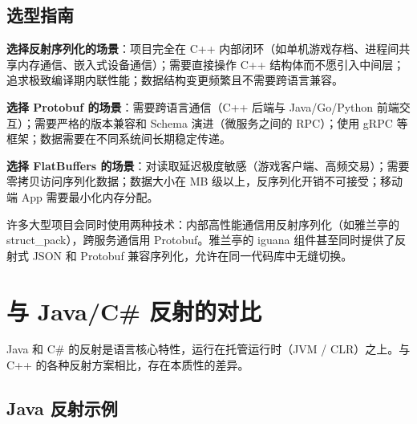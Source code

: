 \documentclass[12pt,a4paper,fontset=fandol]{ctexbook}
\begin{document}
\subsection{选型指南}

\textbf{选择反射序列化的场景}：项目完全在 C++ 内部闭环（如单机游戏存档、进程间共享内存通信、嵌入式设备通信）；需要直接操作 C++ 结构体而不愿引入中间层；追求极致编译期内联性能；数据结构变更频繁且不需要跨语言兼容。

\textbf{选择 Protobuf 的场景}：需要跨语言通信（C++ 后端与 Java/Go/Python 前端交互）；需要严格的版本兼容和 Schema 演进（微服务之间的 RPC）；使用 gRPC 等框架；数据需要在不同系统间长期稳定传递。

\textbf{选择 FlatBuffers 的场景}：对读取延迟极度敏感（游戏客户端、高频交易）；需要零拷贝访问序列化数据；数据大小在 MB 级以上，反序列化开销不可接受；移动端 App 需要最小化内存分配。

\begin{warning}[title={混合使用的常见模式}]
许多大型项目会同时使用两种技术：内部高性能通信用反射序列化（如雅兰亭的 struct\_pack），跨服务通信用 Protobuf。雅兰亭的 iguana 组件甚至同时提供了反射式 JSON 和 Protobuf 兼容序列化，允许在同一代码库中无缝切换。
\end{warning}

\section{与 Java/C\# 反射的对比}\label{sec:jvm_clr}

Java 和 C\# 的反射是语言核心特性，运行在托管运行时（JVM / CLR）之上。与 C++ 的各种反射方案相比，存在本质性的差异。

\subsection{Java 反射示例}
\end{document}
